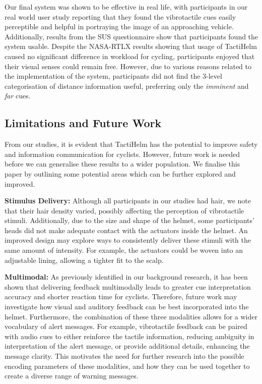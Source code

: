 \documentclass{mpaper}
\begin{document}
Our final system was shown to be effective in real life, with participants in our real world user study reporting that they found the vibrotactile cues easily perceptible and helpful in portraying the image of an approaching vehicle. Additionally, results from the SUS questionnaire show that participants found the system usable. Despite the NASA-RTLX results showing that usage of TactiHelm caused no significant difference in workload for cycling, participants enjoyed that their visual senses could remain free. However, due to various reasons related to the implementation of the system, participants did not find the 3-level categorisation of distance information useful, preferring only the \textit{imminent} and \textit{far} cues.

\subsection{Limitations and Future Work}
From our studies, it is evident that TactiHelm has the potential to improve safety and information communication for cyclists. However, future work is needed before we can generalise these results to a wider population. We finalise this paper by outlining some potential areas which can be further explored and improved.

\textbf{Stimulus Delivery:} Although all participants in our studies had hair, we note that their hair density varied, possibly affecting the perception of vibrotactile stimuli. Additionally, due to the size and shape of the helmet, some participants' heads did not make adequate contact with the actuators inside the helmet. An improved design may explore ways to consistently deliver these stimuli with the same amount of intensity. For example, the actuators could be woven into an adjustable lining, allowing a tighter fit to the scalp. 

\textbf{Multimodal:} As previously identified in our background research, it has been shown that delivering feedback multimodally leads to greater cue interpretation accuracy and shorter reaction time for cyclists. Therefore, future work may investigate how visual and auditory feedback can be best incorporated into the helmet. Furthermore, the combination of these three modalities allows for a wider vocabulary of alert messages. For example, vibrotactile feedback can be paired with audio cues to either reinforce the tactile information, reducing ambiguity in interpretation of the alert message, or provide additional details, enhancing the message clarity. This motivates the need for further research into the possible encoding parameters of these modalities, and how they can be used together to create a diverse range of warning messages. 
\end{document}
